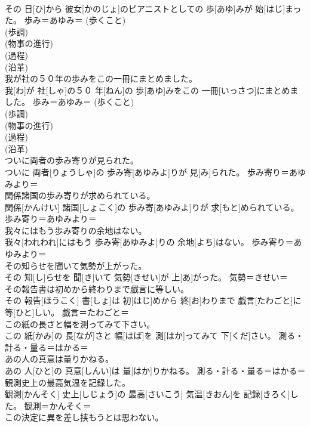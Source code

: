 \documentclass[8pt]{extreport}
\begin{document}
\begin{CJK}{UTF8}{min}
\\	その 日[ひ]から 彼女[かのじょ]のピアニストとしての 歩[あゆ]みが 始[はじ]まった。	歩み＝あゆみ＝ (歩くこと) 
\\	(歩調) 
\\	(物事の進行) 
\\	(過程) 
\\	(沿革) 
\\	我が社の５０年の歩みをこの一冊にまとめました。	
\\	我[わ]が 社[しゃ]の５０ 年[ねん]の 歩[あゆ]みをこの 一冊[いっさつ]にまとめました。	歩み＝あゆみ＝ (歩くこと) 
\\	(歩調) 
\\	(物事の進行) 
\\	(過程) 
\\	(沿革) 
\\	ついに両者の歩み寄りが見られた。	
\\	ついに 両者[りょうしゃ]の 歩み寄[あゆみよ]りが 見[み]られた。	歩み寄り＝あゆみより＝ 
\\	関係諸国の歩み寄りが求められている。	
\\	関係[かんけい] 諸国[しょこく]の 歩み寄[あゆみよ]りが 求[もと]められている。	歩み寄り＝あゆみより＝ 
\\	我々にはもう歩み寄りの余地はない。	
\\	我々[われわれ]にはもう 歩み寄[あゆみよ]りの 余地[よち]はない。	歩み寄り＝あゆみより＝ 
\\	その知らせを聞いて気勢が上がった。	
\\	その 知[し]らせを 聞[き]いて 気勢[きせい]が 上[あ]がった。	気勢＝きせい＝ 
\\	その報告書は初めから終わりまで戯言に等しい。	
\\	その 報告[ほうこく] 書[しょ]は 初[はじ]めから 終[お]わりまで 戯言[たわごと]に 等[ひと]しい。	戯言＝たわごと＝ 
\\	この紙の長さと幅を測ってみて下さい。	
\\	この 紙[かみ]の 長[なが]さと 幅[はば]を 測[はか]ってみて 下[くだ]さい。	測る・計る・量る＝はかる＝ 
\\	あの人の真意は量りかねる。	
\\	あの 人[ひと]の 真意[しんい]は 量[はか]りかねる。	測る・計る・量る＝はかる＝ 
\\	観測史上の最高気温を記録した。	
\\	観測[かんそく] 史上[しじょう]の 最高[さいこう] 気温[きおん]を 記録[きろく]した。	観測＝かんそく＝ 
\\	この決定に異を差し挟もうとは思わない。	

\end{CJK}
\end{document}
